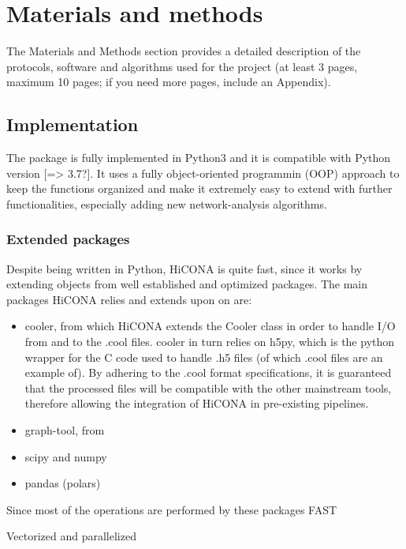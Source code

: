 \graphicspath{{chapters/04_materials_and_methods/}}
\chapter{Materials and methods}

The Materials and Methods section provides a detailed description of the protocols,
software and algorithms used for the project (at least 3 pages, maximum 10 pages; if you need
more pages, include an Appendix).

\section{Implementation}
The package is fully implemented in Python3 and it is compatible with Python version [=> 3.7?].
It uses a fully object-oriented programmin (OOP) approach to keep the functions organized and make it extremely easy to extend with further functionalities, especially adding new network-analysis algorithms.

\subsection{Extended packages}
Despite being written in Python, HiCONA is quite fast, since it works by extending objects from well established and optimized packages. The main packages HiCONA relies and extends upon on are:

\begin{itemize}\tightlist
  \item cooler, from which HiCONA extends the Cooler class in order to handle I/O from and to the .cool files. cooler in turn relies on h5py, which is the python wrapper for the C code used to handle .h5 files (of which .cool files are an example of). By adhering to the .cool format specifications, it is guaranteed that the processed files will be compatible with the other mainstream tools, therefore allowing the integration of HiCONA in pre-existing pipelines. 
  \item graph-tool, from 
  \item scipy and numpy
  \item pandas (polars)
\end{itemize}

Since most of the operations are performed by these packages FAST

Vectorized and parallelized 


